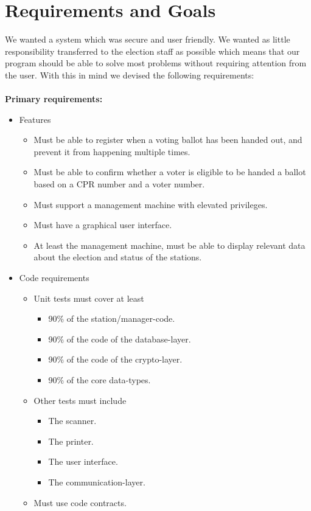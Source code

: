 \documentclass[a4paper]{report}
\begin{document}
\chapter{Requirements and Goals}
We wanted a system which was secure and user friendly. We wanted as little responsibility transferred to the election staff as possible which means that our program should be able to solve most problems without requiring attention from the user. With this in mind we devised the following requirements:
\\ \\ \noindent \bf Primary requirements: \rm
\begin{itemize}
\item Features
\begin{itemize}
\item Must be able to register when a voting ballot has been handed out, and prevent it from happening multiple times.
\item Must be able to confirm whether a voter is eligible to be handed a ballot based on a CPR number and a voter number.
\item Must support a management machine with elevated privileges.
\item Must have a graphical user interface.
\item At least the management machine, must be able to display relevant data about the election and status of the stations.
\end{itemize}
\item Code requirements
\begin{itemize}
\item Unit tests must cover at least
\begin{itemize}
\item 90\% of the station/manager-code.
\item 90\% of the code of the database-layer.
\item 90\% of the code of the crypto-layer.
\item 90\% of the core data-types.
\end{itemize}
\item Other tests must include
\begin{itemize}
\item The scanner.
\item The printer.
\item The user interface.
\item The communication-layer.
\end{itemize}
\item Must use code contracts.

\end{itemize}
\end{itemize}
\end{document}
